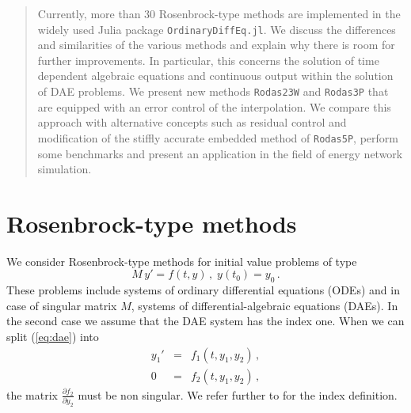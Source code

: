 \documentclass{juliacon}
\begin{document}


\maketitle

\begin{abstract}

Currently, more than 30 Rosenbrock-type methods are implemented in the widely used Julia package \verb|OrdinaryDiffEq.jl|.  
We discuss the differences and similarities of the various methods and explain why there is room for further improvements.
In particular, this concerns the solution of time dependent algebraic equations and continuous output within the solution of DAE problems. 
We present new methods \verb|Rodas23W| and \verb|Rodas3P| that are equipped with an error control of the interpolation.
We compare this approach with alternative concepts such as residual control and modification of the stiffly accurate embedded method of \verb|Rodas5P|, perform some 
benchmarks and present an application in the field of energy network simulation. 

\end{abstract}

\section{Rosenbrock-type methods}
We consider Rosenbrock-type methods for initial value problems of type
\begin{equation}
M \, y' = f(t,y) \, , \; y(t_0)=y_0 \, . \label{eq:dae} 
\end{equation}
These problems include systems of ordinary differential equations (ODEs) and in case of singular matrix $M$, systems of differential-algebraic equations (DAEs).
In the second case we assume that the DAE system has the index one.
When we can split (\ref{eq:dae}) into
\begin{eqnarray}
y_1' &=& f_1(t,y_1,y_2) \, , \label{eq:dae1} \\
0 &=& f_2(t,y_1,y_2) \, , \label{eq:dae2} 
\end{eqnarray}
the matrix $\frac{\partial f_2}{\partial y_2}$ must be non singular.
We refer further to \cite{hairer} for the index definition.
\end{document}
